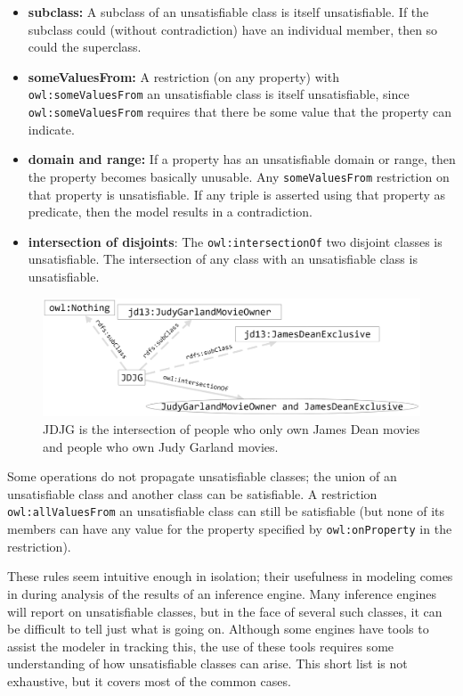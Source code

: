 \begin{itemize}
\item \textbf{subclass:} A subclass of an unsatisfiable class is itself unsatisfiable.
If the subclass could (without contradiction) have an individual member,
then so could the superclass.

\item \textbf{someValuesFrom:} A restriction (on any property) with \texttt{owl:someValuesFrom}
an unsatisfiable
class is itself unsatisfiable, since \texttt{owl:someValuesFrom} requires that
there be some value that the property can indicate.

\item \textbf{domain and range:} If a property has an unsatisfiable domain or range,
then the property becomes basically unusable. Any \texttt{someValuesFrom}
restriction on that property is unsatisfiable. If any triple is asserted
using that property as predicate, then the model results in a
contradiction.

\item \textbf{intersection of disjoints}: The \texttt{owl:intersectionOf} two disjoint classes
is unsatisfiable. The intersection of any class with an unsatisfiable
class is unsatisfiable.
\end{itemize}


\begin{figure}
\centering
\includegraphics[width=5in]{SWWOv3/media/ch13/figure13-8.png}
\caption{JDJG is the intersection of people who only own James Dean movies and
people who own Judy Garland movies.}
\label{fig:ch13.08}
\end{figure}



Some operations do not propagate unsatisfiable classes; the union of an
unsatisfiable class and another class can be satisfiable. A restriction
\texttt{owl:allValuesFrom} an unsatisfiable class can still be satisfiable (but
none of its members can have any value for the property specified by
\texttt{owl:onProperty} in the restriction).

These rules seem intuitive enough in isolation; their usefulness in
modeling comes in during analysis of
the results of an inference engine. Many inference engines will report
on unsatisfiable classes, but in the face of several such classes, it
can be difficult to tell just what is going on. Although some engines
have tools to assist the modeler in tracking this, the use of these
tools requires some understanding of how unsatisfiable classes can
arise. This short list is not exhaustive, but it covers most of the
common cases.

